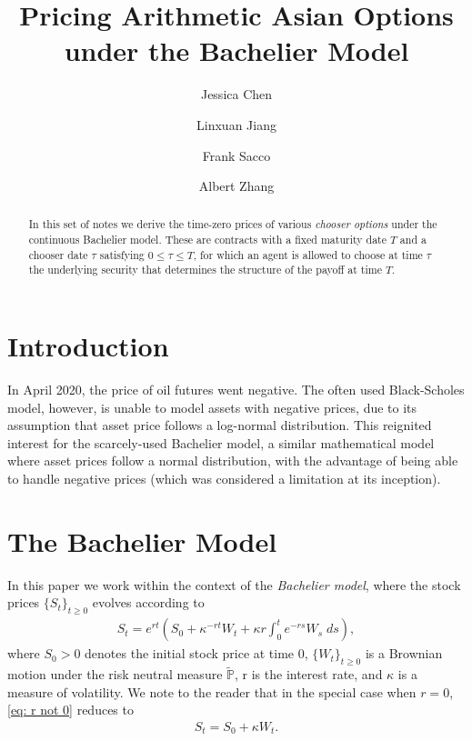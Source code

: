 \documentclass[reqno]{amsart}
\title{Pricing Arithmetic Asian Options under the Bachelier Model} %
\author{Jessica Chen}
\author{Linxuan Jiang}
\author{Frank Sacco}
\author{Albert Zhang}
\begin{document}

\begin{abstract}
     In this set of notes we derive the time-zero prices of various \emph{chooser options} under the continuous Bachelier model.
     These are contracts with a fixed maturity date $T$ and a chooser date $\tau$ satisfying $0 \le \tau \le T$, for which an agent is allowed to choose at time $\tau$ the underlying security that determines the structure of the payoff at time $T$.  
\end{abstract}


\maketitle  
\tableofcontents

\section{Introduction}
In April 2020, the price of oil futures went negative.
The often used Black-Scholes model, however, is unable to model assets with negative prices, due to its assumption that asset price follows a log-normal distribution.
This reignited interest for the scarcely-used Bachelier model, a similar mathematical model where asset prices follow a normal distribution, with the advantage of being able to handle negative prices (which was considered a limitation at its inception).

\section{The Bachelier Model}
In this paper we work within the context of the \emph{Bachelier model}, where the stock prices $\{S_t\}_{t \ge 0}$ evolves according to 
\begin{align}\label{eq: r not 0}
	 S_t = e^{rt} \left( S_0 + \kappa^{-rt}W_t + \kappa r \int_0^t e^{-rs} W_s \; ds \right),
\end{align}
where $S_0 > 0$ denotes the initial stock price at time 0, $\{W_t\}_{t \ge 0}$ is a Brownian motion under the risk neutral measure $\tilde{\mathbb{P}}$, r is the interest rate, and $\kappa$ is a measure of volatility.
We note to the reader that in the special case when $r = 0$, \eqref{eq: r not 0} reduces to 
\begin{align}\label{eq: r=0}
      S_t = S_0 + \kappa W_t. 
\end{align}
\end{document}
